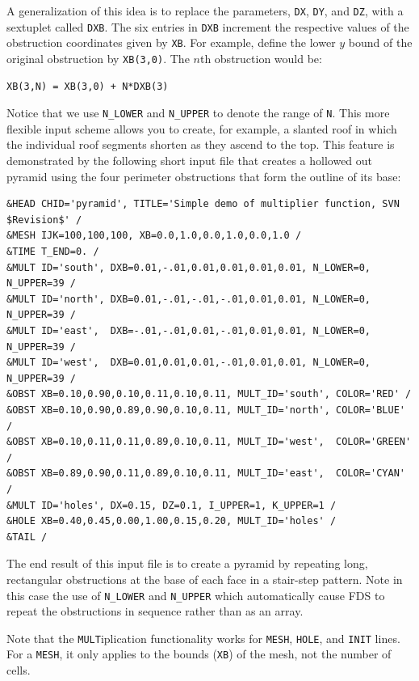 \documentclass[11pt]{book}
\newcommand{\ct}{\tt\small}
\begin{document}
A generalization of this idea is to replace the parameters, {\ct DX}, {\ct DY}, and {\ct DZ}, with a sextuplet called {\ct DXB}.
The six entries in {\ct DXB} increment the respective values of the obstruction coordinates given by {\ct XB}. For example,
define the lower $y$ bound of the original obstruction by {\ct XB(3,0)}. The $n$th obstruction would be:

\footnotesize
\begin{verbatim}
XB(3,N) = XB(3,0) + N*DXB(3)
\end{verbatim}
\normalsize

\noindent
Notice that we use {\ct N\_LOWER} and {\ct N\_UPPER} to denote the range of {\ct N}. This more flexible input scheme allows you to create, for example,
a slanted roof in which the individual roof segments shorten as they ascend to the top.
This feature is demonstrated by the following short input file that creates a hollowed out pyramid using the four perimeter obstructions that form the
outline of its base:

\footnotesize
\begin{verbatim}
&HEAD CHID='pyramid', TITLE='Simple demo of multiplier function, SVN $Revision$' /
&MESH IJK=100,100,100, XB=0.0,1.0,0.0,1.0,0.0,1.0 /
&TIME T_END=0. /
&MULT ID='south', DXB=0.01,-.01,0.01,0.01,0.01,0.01, N_LOWER=0, N_UPPER=39 /
&MULT ID='north', DXB=0.01,-.01,-.01,-.01,0.01,0.01, N_LOWER=0, N_UPPER=39 /
&MULT ID='east',  DXB=-.01,-.01,0.01,-.01,0.01,0.01, N_LOWER=0, N_UPPER=39 /
&MULT ID='west',  DXB=0.01,0.01,0.01,-.01,0.01,0.01, N_LOWER=0, N_UPPER=39 /
&OBST XB=0.10,0.90,0.10,0.11,0.10,0.11, MULT_ID='south', COLOR='RED' /
&OBST XB=0.10,0.90,0.89,0.90,0.10,0.11, MULT_ID='north', COLOR='BLUE' /
&OBST XB=0.10,0.11,0.11,0.89,0.10,0.11, MULT_ID='west',  COLOR='GREEN' /
&OBST XB=0.89,0.90,0.11,0.89,0.10,0.11, MULT_ID='east',  COLOR='CYAN' /
&MULT ID='holes', DX=0.15, DZ=0.1, I_UPPER=1, K_UPPER=1 /
&HOLE XB=0.40,0.45,0.00,1.00,0.15,0.20, MULT_ID='holes' /
&TAIL /
\end{verbatim}
\normalsize

\noindent
The end result of this input file is to create a pyramid by repeating long, rectangular obstructions at the base of each
face in a stair-step pattern. Note in this case the use of {\ct N\_LOWER} and {\ct N\_UPPER} which automatically cause FDS to
repeat the obstructions in sequence rather than as an array.

Note that the {\ct MULT}iplication functionality works for {\ct MESH}, {\ct HOLE}, and {\ct INIT} lines. For a {\ct MESH}, it only applies to the
bounds ({\ct XB}) of the mesh, not the number of cells.
\end{document}

